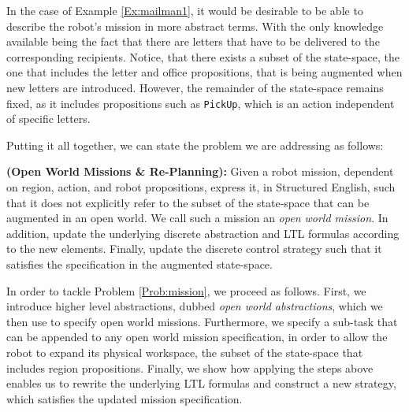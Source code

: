 In the case of Example \ref{Ex:mailman1}, it would be desirable to be able to describe the robot's mission in more abstract terms. With the only knowledge available being the fact that there are letters that have to be delivered to the corresponding recipients. Notice, that there exists a subset of the state-space, the one that includes the letter and office propositions, that is being augmented when new letters are introduced. However, the remainder of the state-space remains fixed, as it includes propositions such as \texttt{PickUp}, which is an action independent of specific letters. 

Putting it all together, we can state the problem we are addressing as follows:

\begin{myProblem}\label{Prob:mission}
	\textbf{(Open World Missions \& Re-Planning):} 
	Given a robot mission, dependent on region, action, and robot propositions, express it, in Structured English, such that it does not explicitly refer to the subset of the state-space that can be augmented in an open world. We call such a mission an \emph{open world mission}. In addition, update the underlying discrete abstraction and LTL formulas according to the new elements. Finally, update the discrete control strategy such that it satisfies the specification in the augmented state-space.
\end{myProblem}

In order to tackle Problem \ref{Prob:mission}, we proceed as follows. First, we introduce higher level abstractions, dubbed \emph{open world abstractions}, %
which we then use to specify open world missions. Furthermore, we specify a sub-task that can be appended to any open world mission specification, in order to allow the robot to expand its physical workspace, the subset of the state-space that includes region propositions. Finally, we  show how applying the steps above enables us to rewrite the underlying LTL formulas and construct a new strategy, which satisfies the updated mission specification.

